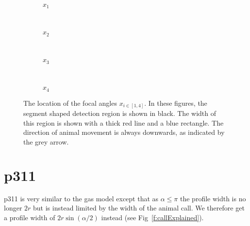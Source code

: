 \begin{figure}[t]
        \centering
        \begin{subfigure}[t]{0.34\textwidth}
                \centering
                \caption{$x_1$}
                \label{f:tikz1}
        \end{subfigure}
        ~ 
        \begin{subfigure}[t]{0.22\textwidth}
                \centering
                \caption{$x_2$}
                \label{f:x2}
        \end{subfigure}
        ~ 
	\begin{subfigure}[t]{0.22\textwidth}
                \centering
                \caption{$x_3$}
                \label{f:x3}
        \end{subfigure}%
	~
	\begin{subfigure}[t]{0.22\textwidth}
                \centering
                \caption{$x_4$}
                \label{f:x4}
        \end{subfigure}%
\caption{The location of the focal angles $x_{i\in[1,4]}$. In these figures, the segment shaped detection region is shown in black. The width of this region is shown with a thick red line and a blue rectangle. The direction of animal movement is always downwards, as indicated by the grey arrow.}
\label{f:xis}
\end{figure}



\section{p311} \label{p311}

p311 is very similar to the gas model except that as $\alpha \le \pi$ the profile width is no longer $2r$ but is instead limited by the width of the animal call. We therefore get a profile width of $2r\sin(\alpha/2)$ instead (see Fig~\ref{f:callExplained}).


